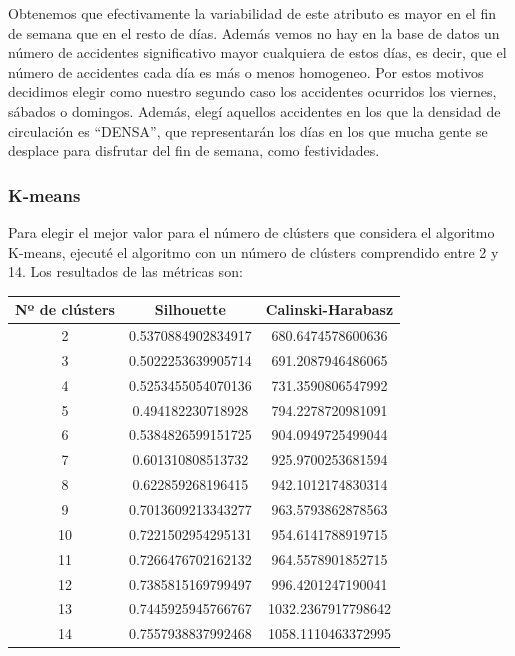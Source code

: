 \documentclass[a4]{article}
\begin{document}
Obtenemos que efectivamente la variabilidad de este atributo es mayor en el fin de semana que en el resto de días. Además vemos no hay en la base de datos un número de accidentes significativo mayor cualquiera de estos días, es decir, que el número de accidentes cada día es más o menos homogeneo. Por estos motivos decidimos elegir como nuestro segundo caso los accidentes ocurridos los viernes, sábados o domingos. Además, elegí aquellos accidentes en los que la densidad de circulación es ``DENSA'', que representarán los días en los que mucha gente se desplace para disfrutar del fin de semana, como festividades.

\subsubsection{K-means}

Para elegir el mejor valor para el número de clústers que considera el algoritmo K-means, ejecuté el algoritmo con un número de clústers comprendido entre 2 y 14. Los resultados de las métricas son:

\begin{center}
\begin{tabular}{|c|c|c|}
\hline
\multicolumn{1}{|c|}{\textbf{Nº de clústers}}& \textbf{Silhouette} & \textbf{Calinski-Harabasz}\\ \hline
  2  & 0.5370884902834917 & 680.6474578600636  \\ \hline
  3  & 0.5022253639905714 & 691.2087946486065  \\ \hline
  4  & 0.5253455054070136 & 731.3590806547992  \\ \hline
  5  & 0.494182230718928  & 794.2278720981091  \\ \hline
  6  & 0.5384826599151725 & 904.0949725499044  \\ \hline
  7  & 0.601310808513732  & 925.9700253681594  \\ \hline
  8  & 0.622859268196415  & 942.1012174830314  \\ \hline
  9  & 0.7013609213343277 & 963.5793862878563  \\ \hline
 10  & 0.7221502954295131 & 954.6141788919715  \\ \hline
 11  & 0.7266476702162132 & 964.5578901852715  \\ \hline
 12  & 0.7385815169799497 & 996.4201247190041  \\ \hline
 13  & 0.7445925945766767 & 1032.2367917798642 \\ \hline
 14  & 0.7557938837992468 & 1058.1110463372995 \\ \hline
\end{tabular}
\end{center}
\end{document}
